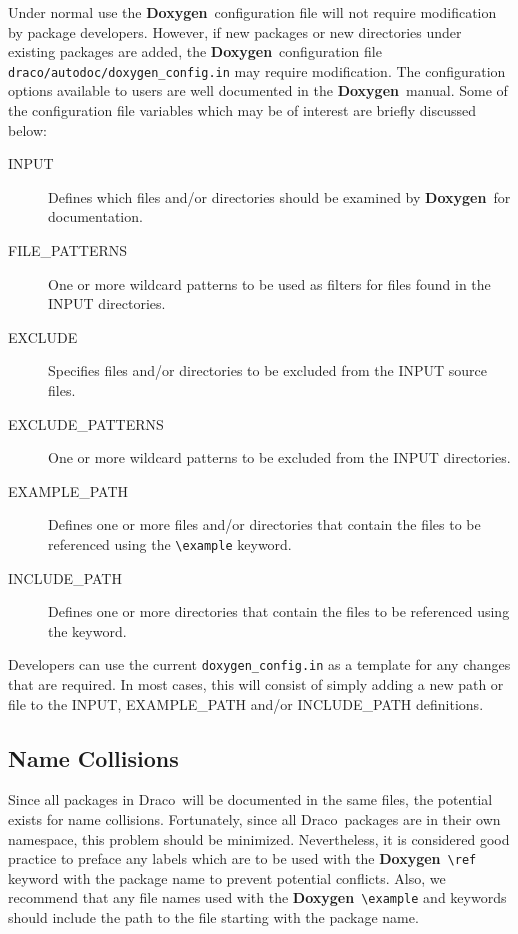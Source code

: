 \documentclass[11pt]{ResearchNote}
\newcommand{\draco}{{\normalfont\sffamily Draco}}
\newcommand{\doxy}{{\normalfont\bfseries Doxygen}}
\begin{document}
Under normal use the \doxy\ configuration file will not require
modification by package developers. However, if new packages or
new directories under existing packages are added,
the \doxy\ configuration file \texttt{draco/autodoc/doxygen\_config.in}
may require modification.
The configuration options available to users are well
documented in the \doxy\ manual. Some of the configuration file 
variables which may be of interest are briefly discussed below:
\begin{description}
\item[\ttfamily INPUT] Defines which files and/or
  directories should be  examined by \doxy\ for documentation.  
\item [\ttfamily FILE\_PATTERNS] One or more wildcard patterns to be
  used as filters for files found in the INPUT directories. 
\item [\ttfamily EXCLUDE] Specifies files and/or directories to be
   excluded from the INPUT source files.
\item [\ttfamily EXCLUDE\_PATTERNS] One or more wildcard patterns to be
  excluded from the INPUT directories.
\item [\ttfamily EXAMPLE\_PATH] Defines one or more files and/or
  directories that contain the files to be referenced using
  the \verb+\example+ keyword.
\item [\ttfamily INCLUDE\_PATH] Defines one or more 
  directories that contain the files to be referenced using the
 \verb++ keyword.
\end{description}

Developers can use the current \texttt{doxygen\_config.in} as a template for
any changes that are required. In most cases, this will consist of
simply adding a new path or file to the INPUT, EXAMPLE\_PATH and/or 
INCLUDE\_PATH definitions.

\subsection{Name Collisions}
Since all packages in \draco\ will be documented in the same
files, the potential exists for name collisions. Fortunately,
since all \draco\ packages are in their own namespace, this problem
should be minimized. Nevertheless, 
    it is considered good practice  to preface any labels which are to be
used with the \doxy\ \verb+\ref+ keyword with the
    package name to prevent potential conflicts.
Also, we recommend that any file names used
with the \doxy\ \verb+\example+ and \verb++ keywords
should include the path to the file starting with the package name.
\end{document}
